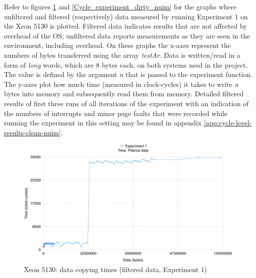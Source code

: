Refer to figures \ref{Cycle_experiment_clean_nuim} and \ref{Cycle_experiment_dirty_nuim} for the graphs where unfiltered and filtered (respectively) data measured by running Experiment 1 on the Xeon 5130 is plotted. Filtered data indicates results that are not affected by overhead of the OS; unfiltered data reports measurements as they are seen in the environment, including overhead. On these graphs the x-axes represent the numbers of bytes transferred using the array \textit{testAr}. Data is written/read in a form of \textit{long} words, which are 8 bytes each, on both systems used in the project. The value is defined by the argument \textit{n} that is passed to the experiment function. The y-axes plot how much time (measured in clock-cycles) it takes to write \textit{n} bytes into memory and subsequently read them from memory. Detailed filtered results of first three runs of all iterations of the experiment with an indication of the numbers of interrupts and minor page faults that were recorded while running the experiment in this setting may be found in appendix \ref{app:cycle-level-results-clean-nuim}.

\begin{figure}[!htb]
\centering
\includegraphics[width=145mm]{6/Cycle_experiment_clean_nuim.png}
\caption{Xeon 5130: data copying times (filtered data, Experiment 1)}
\label{Cycle_experiment_clean_nuim}
\end{figure}

